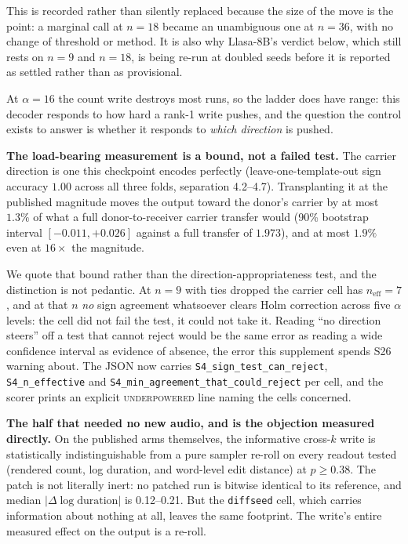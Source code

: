 \documentclass[11pt]{article}
\begin{document}
This is recorded rather than silently replaced because the size of the move is
the point: a marginal call at $n{=}18$ became an unambiguous one at $n{=}36$,
with no change of threshold or method. It is also why Llasa-8B's verdict below,
which still rests on $n{=}9$ and $n{=}18$, is being re-run at doubled seeds
before it is reported as settled rather than as provisional.

At $\alpha{=}16$ the count write destroys most runs, so the ladder does have
range: this decoder responds to how hard a rank-1 write pushes, and the question
the control exists to answer is whether it responds to \emph{which direction} is
pushed.

\textbf{The load-bearing measurement is a bound, not a failed test.} The carrier
direction is one this checkpoint encodes perfectly (leave-one-template-out sign
accuracy $1.00$ across all three folds, separation 4.2--4.7). Transplanting it at
the published magnitude moves the output toward the donor's carrier by at most
$1.3\%$ of what a full donor-to-receiver carrier transfer would (90\% bootstrap
interval $[-0.011, +0.026]$ against a full transfer of $1.973$), and at most
$1.9\%$ even at $16\times$ the magnitude.

We quote that bound rather than the direction-appropriateness test, and the
distinction is not pedantic. At $n{=}9$ with ties dropped the carrier cell has
$n_{\text{eff}}{=}7$, and at that $n$ \emph{no} sign agreement whatsoever clears
Holm correction across five $\alpha$ levels: the cell did not fail the test, it
could not take it. Reading ``no direction steers'' off a test that cannot reject
would be the same error as reading a wide confidence interval as evidence of
absence, the error this supplement spends S26 warning about. The JSON now
carries \texttt{S4\_sign\_test\_can\_reject}, \texttt{S4\_n\_effective} and
\texttt{S4\_min\_agreement\_that\_could\_reject} per cell, and the scorer prints
an explicit \textsc{underpowered} line naming the cells concerned.

\textbf{The half that needed no new audio, and is the objection measured
directly.} On the published arms themselves, the informative cross-$k$ write is
statistically indistinguishable from a pure sampler re-roll on every readout
tested (rendered count, log duration, and word-level edit distance) at
$p \ge 0.38$. The patch is not literally inert: no patched run is bitwise
identical to its reference, and median $|\Delta \log \text{duration}|$ is
0.12--0.21. But the \texttt{diffseed} cell, which carries information about
nothing at all, leaves the same footprint. The write's entire measured effect on
the output is a re-roll.
\end{document}
